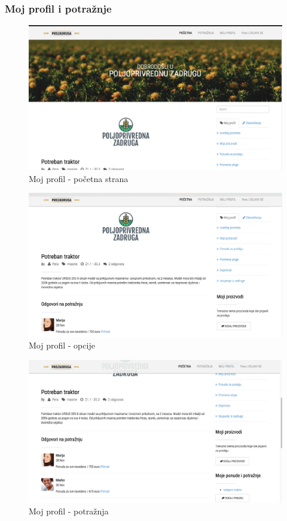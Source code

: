 \documentclass[a4paper, oneside]{article}
\begin{document}
\subsubsection{Moj profil i potražnje}
\begin{figure}[h!]
    \centering
    \includegraphics[scale=0.3]{images/profile1.png}
    \caption{Moj profil - početna strana}
    \label{profile1}
\end{figure}

\begin{figure}[h!]
    \centering
    \includegraphics[scale=0.3]{images/profile2.png}
    \caption{Moj profil - opcije}
    \label{profile2}
\end{figure}

\begin{figure}[h!]
    \centering
    \includegraphics[scale=0.3]{images/profile3.png}
    \caption{Moj profil - potražnja}
    \label{profile3}
\end{figure}
\end{document}
